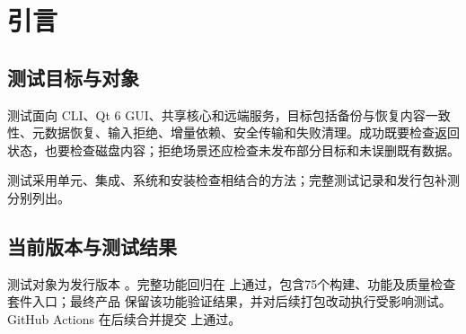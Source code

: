 \section{引言}
\subsection{测试目标与对象}
测试面向 CLI、Qt 6 GUI、共享核心和远端服务，目标包括备份与恢复内容一致性、元数据恢复、输入拒绝、增量依赖、安全传输和失败清理。成功既要检查返回状态，也要检查磁盘内容；拒绝场景还应检查未发布部分目标和未误删既有数据。

测试采用单元、集成、系统和安装检查相结合的方法；完整测试记录和发行包补测分别列出。

\subsection{当前版本与测试结果}
测试对象为发行版本 。完整功能回归在
 上通过，包含75个构建、功能及质量检查套件入口；最终产品
 保留该功能验证结果，并对后续打包改动执行受影响测试。
GitHub Actions 在后续合并提交  上通过。

